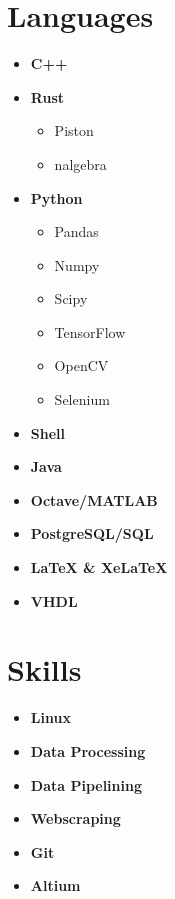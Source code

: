 \documentclass[]{chandan-cv}
\begin{document}
\begin{minipage}[t]{0.27\textwidth}


\section{Languages}
	\begin{itemize}
		\setlength\itemsep{-0.2em}
		\item \textbf{C++}
		\item \textbf{Rust}
				\begin{itemize}
						\setlength\itemsep{-0.17em}
						\item Piston
						\item nalgebra
				\end{itemize}
		\item \textbf{Python}
			\begin{itemize}
				\setlength\itemsep{-0.17em}
				\item Pandas
				\item Numpy
				\item Scipy
				\item TensorFlow
				\item OpenCV
				\item Selenium
			\end{itemize}
		\item \textbf{Shell}
		\item \textbf{Java}   
		\item \textbf{Octave/MATLAB}
		\item \textbf{PostgreSQL/SQL}
		\item \textbf{LaTeX \& XeLaTeX}
		\item \textbf{VHDL}
	\end{itemize}
\sectionsep


\section{Skills}
	\begin{itemize}
		\setlength\itemsep{-0.17em}
		\item \textbf{Linux}
		\item \textbf{Data Processing}
		\item \textbf{Data Pipelining}
		\item \textbf{Webscraping}
		\item \textbf{Git}
		\item \textbf{Altium}
	\end{itemize}
\sectionsep


\end{minipage}
\end{document}
